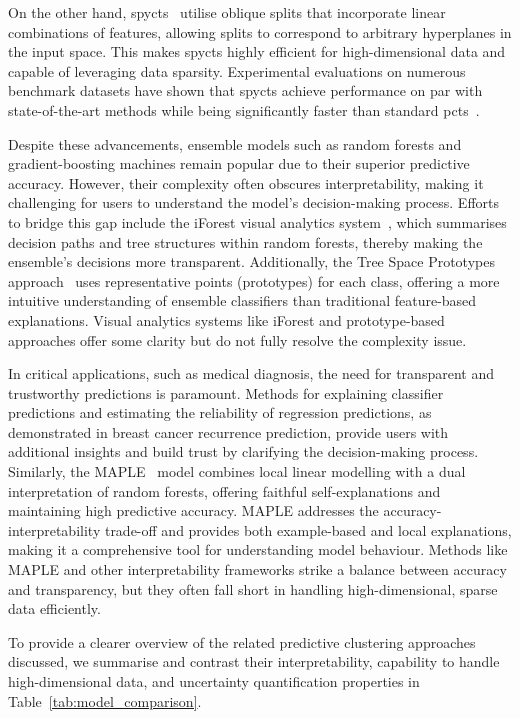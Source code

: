 \documentclass[3p,review,authoryear]{elsarticle}
\begin{document}
On the other hand, \glspl{spyct}~\citep{Stepi_nik_2021} utilise oblique splits that incorporate linear combinations of features, allowing splits to correspond to arbitrary hyperplanes in the input space.
This makes \glspl{spyct} highly efficient for high-dimensional data and capable of leveraging data sparsity.
Experimental evaluations on numerous benchmark datasets have shown that \glspl{spyct} achieve performance on par with state-of-the-art methods while being significantly faster than standard \glspl{pct}~\citep{Andonovikj_2024}.

Despite these advancements, ensemble models such as random forests and gradient-boosting machines remain popular due to their superior predictive accuracy.
However, their complexity often obscures interpretability, making it challenging for users to understand the model’s decision-making process.
Efforts to bridge this gap include the iForest visual analytics system~\citep{Zhao_2019}, which summarises decision paths and tree structures within random forests, thereby making the ensemble's decisions more transparent.
Additionally, the Tree Space Prototypes approach~\citep{Tan_2020} uses representative points (prototypes) for each class, offering a more intuitive understanding of ensemble classifiers than traditional feature-based explanations.
Visual analytics systems like iForest and prototype-based approaches offer some clarity but do not fully resolve the complexity issue.

In critical applications, such as medical diagnosis, the need for transparent and trustworthy predictions is paramount.
Methods for explaining classifier predictions and estimating the reliability of regression predictions, as demonstrated in breast cancer recurrence prediction, provide users with additional insights and build trust by clarifying the decision-making process.
Similarly, the MAPLE~\citep{plumb2018model} model combines local linear modelling with a dual interpretation of random forests, offering faithful self-explanations and maintaining high predictive accuracy.
MAPLE addresses the accuracy-interpretability trade-off and provides both example-based and local explanations, making it a comprehensive tool for understanding model behaviour.
Methods like MAPLE and other interpretability frameworks strike a balance between accuracy and transparency, but they often fall short in handling high-dimensional, sparse data efficiently.

To provide a clearer overview of the related predictive clustering approaches discussed, we summarise and contrast their interpretability, capability to handle high-dimensional data, and uncertainty quantification properties in Table~\ref{tab:model_comparison}.
\end{document}
